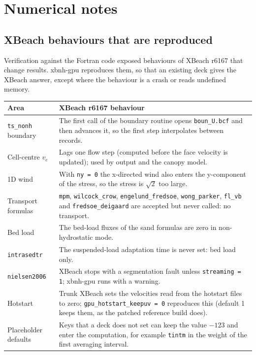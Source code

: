 \documentclass[11pt,a4paper]{article}
\newcommand{\code}[1]{\texttt{#1}}
\begin{document}
\section{Numerical notes}\label{sec:numerics}

\subsection{XBeach behaviours that are reproduced}
Verification against the Fortran code exposed behaviours of XBeach r6167 that change results. xbnh-gpu
reproduces them, so that an existing deck gives the XBeach answer, except where the behaviour is a crash or
reads undefined memory.
\begin{center}\small
\begin{tabularx}{\textwidth}{lX}
\toprule
Area & XBeach r6167 behaviour \\
\midrule
\code{ts\_nonh} boundary & The first call of the boundary routine opens \code{boun\_U.bcf} and then advances it, so the first step interpolates between records. \\
Cell-centre $v_e$ & Lags one flow step (computed before the face velocity is updated); used by output and the canopy model. \\
1D wind & With \code{ny = 0} the x-directed wind also enters the y-component of the stress, so the stress is $\sqrt{2}$ too large. \\
Transport formulas & \code{mpm}, \code{wilcock\_crow}, \code{engelund\_fredsoe}, \code{wong\_parker}, \code{fl\_vb} and \code{fredsoe\_deigaard} are accepted but never called: no transport. \\
Bed load & The bed-load fluxes of the sand formulas are zero in non-hydrostatic mode. \\
\code{intrasedtr} & The suspended-load adaptation time is never set: bed load only. \\
\code{nielsen2006} & XBeach stops with a segmentation fault unless \code{streaming = 1}; xbnh-gpu runs with a warning. \\
Hotstart & Trunk XBeach sets the velocities read from the hotstart files to zero; \code{gpu\_hotstart\_keepuv = 0} reproduces this (default 1 keeps them, as the patched reference build does). \\
Placeholder defaults & Keys that a deck does not set can keep the value $-123$ and enter the computation, for example \code{tintm} in the weight of the first averaging interval. \\

\end{tabularx}
\end{center}
\end{document}
